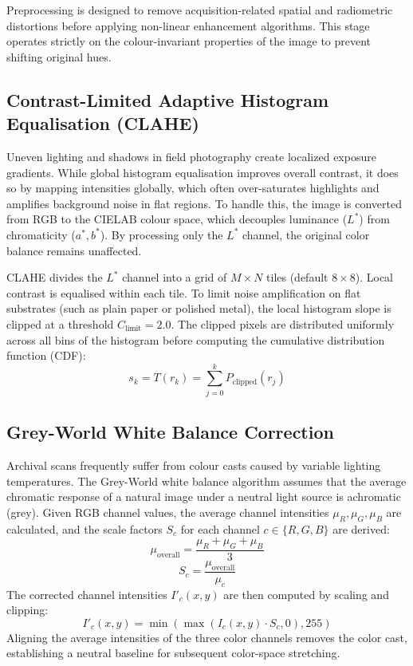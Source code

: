 Preprocessing is designed to remove acquisition-related spatial and radiometric distortions before applying non-linear enhancement algorithms. This stage operates strictly on the colour-invariant properties of the image to prevent shifting original hues.

\subsection{Contrast-Limited Adaptive Histogram Equalisation (CLAHE)}
Uneven lighting and shadows in field photography create localized exposure gradients. While global histogram equalisation improves overall contrast, it does so by mapping intensities globally, which often over-saturates highlights and amplifies background noise in flat regions. To handle this, the image is converted from RGB to the CIELAB colour space, which decouples luminance ($L^*$) from chromaticity ($a^*, b^*$). By processing only the $L^*$ channel, the original color balance remains unaffected. 

CLAHE divides the $L^*$ channel into a grid of $M \times N$ tiles (default $8 \times 8$). Local contrast is equalised within each tile. To limit noise amplification on flat substrates (such as plain paper or polished metal), the local histogram slope is clipped at a threshold $C_{\text{limit}} = 2.0$. The clipped pixels are distributed uniformly across all bins of the histogram before computing the cumulative distribution function (CDF):
\begin{equation}
s_k = T(r_k) = \sum_{j=0}^{k} P_{\text{clipped}}(r_j)
\end{equation}

\subsection{Grey-World White Balance Correction}
Archival scans frequently suffer from colour casts caused by variable lighting temperatures. The Grey-World white balance algorithm assumes that the average chromatic response of a natural image under a neutral light source is achromatic (grey). Given RGB channel values, the average channel intensities $\mu_R, \mu_G, \mu_B$ are calculated, and the scale factors $S_c$ for each channel $c \in \{R, G, B\}$ are derived:
\begin{equation}
\mu_{\text{overall}} = \frac{\mu_R + \mu_G + \mu_B}{3}
\end{equation}
\begin{equation}
S_c = \frac{\mu_{\text{overall}}}{\mu_c}
\end{equation}
The corrected channel intensities $I'_{c}(x, y)$ are then computed by scaling and clipping:
\begin{equation}
I'_{c}(x, y) = \min\left(\max\left(I_c(x,y) \cdot S_c, 0\right), 255\right)
\end{equation}
Aligning the average intensities of the three color channels removes the color cast, establishing a neutral baseline for subsequent color-space stretching.

